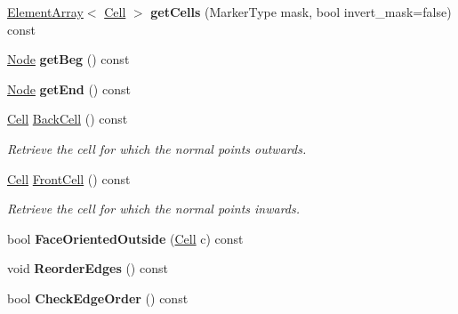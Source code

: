 \begin{DoxyCompactItemize}
\item 
\hypertarget{classINMOST_1_1Face_a757b996ae899ef89a13fb076a34c0528}{\hyperlink{classINMOST_1_1ElementArray}{Element\-Array}$<$ \hyperlink{classINMOST_1_1Cell}{Cell} $>$ {\bfseries get\-Cells} (Marker\-Type mask, bool invert\-\_\-mask=false) const }\label{classINMOST_1_1Face_a757b996ae899ef89a13fb076a34c0528}

\item 
\hypertarget{classINMOST_1_1Face_a944a85186680ca168a45e323ad719d70}{\hyperlink{classINMOST_1_1Node}{Node} {\bfseries get\-Beg} () const }\label{classINMOST_1_1Face_a944a85186680ca168a45e323ad719d70}

\item 
\hypertarget{classINMOST_1_1Face_adb70180c6aad1893e2fe754a8d88e170}{\hyperlink{classINMOST_1_1Node}{Node} {\bfseries get\-End} () const }\label{classINMOST_1_1Face_adb70180c6aad1893e2fe754a8d88e170}

\item 
\hyperlink{classINMOST_1_1Cell}{Cell} \hyperlink{classINMOST_1_1Face_a343f374489d97e5cc41e392f1fd29eea}{Back\-Cell} () const 
\begin{DoxyCompactList}\small\item\em Retrieve the cell for which the normal points outwards. \end{DoxyCompactList}\item 
\hyperlink{classINMOST_1_1Cell}{Cell} \hyperlink{classINMOST_1_1Face_a31695655cabb60aef6e7048d175cd0de}{Front\-Cell} () const 
\begin{DoxyCompactList}\small\item\em Retrieve the cell for which the normal points inwards. \end{DoxyCompactList}\item 
\hypertarget{classINMOST_1_1Face_ac8e9ea9a38d8c5732c3618b21ec6c346}{bool {\bfseries Face\-Oriented\-Outside} (\hyperlink{classINMOST_1_1Cell}{Cell} c) const }\label{classINMOST_1_1Face_ac8e9ea9a38d8c5732c3618b21ec6c346}

\item 
\hypertarget{classINMOST_1_1Face_a0e621e47a29cba52983e2dbe4b5595f5}{void {\bfseries Reorder\-Edges} () const }\label{classINMOST_1_1Face_a0e621e47a29cba52983e2dbe4b5595f5}

\item 
\hypertarget{classINMOST_1_1Face_afe466ba6d89813531fa7d8bcda47c22a}{bool {\bfseries Check\-Edge\-Order} () const }\label{classINMOST_1_1Face_afe466ba6d89813531fa7d8bcda47c22a}


\end{DoxyCompactItemize}
